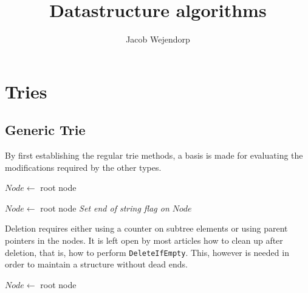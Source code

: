 \documentclass[11pt,a4paper]{article}
\title{Datastructure algorithms}
\author{Jacob Wejendorp}
\begin{document}
\maketitle

\section{Tries}
\subsection{Generic Trie}
By first establishing the regular trie methods, a basis is made for
evaluating the modifications required by the other types.

\begin{algorithm}[H]
    \caption{$k$\FuncSty{)}}
    $Node \leftarrow$  root node\;
\end{algorithm}

\begin{algorithm}[H]
    \caption{$k$\FuncSty{)}}
    $Node \leftarrow$  root node\;
    \emph{Set end of string flag on $Node$}\;
\end{algorithm}

Deletion requires either using a counter on subtree elements or
using parent pointers in the nodes. It is left open by most articles how to
clean up after deletion, that is, how to perform {\tt DeleteIfEmpty}.
This, however is needed in order to maintain a structure without dead ends.

\begin{algorithm}[H]

    \caption{$k$\FuncSty{)}}
    $Node \leftarrow$  root node\;
\end{algorithm}
\end{document}
